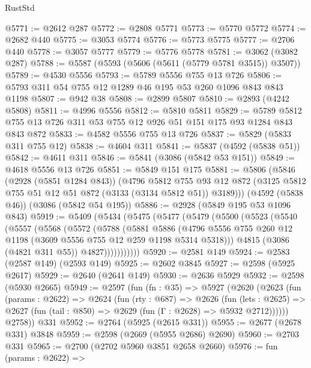 \begin{lexlean}{RustStd}
\begin{coremodule}
@5771 := @2612 @287
@5772 := @2808 @5771
@5773 := @5770 @5772
@5774 := @2682 @440
@5775 := @3053 @5774
@5776 := @5773 @5775
@5777 := @2706 @440
@5778 := @3057 @5777
@5779 := @5776 @5778
@5781 := @3062 (@3082 @287)
@5788 := @5587 (@5593 (@5606 (@5611 (@5779 @5781 @3515)) @3507))
@5789 := @4530 @5556
@5793 := @5789 @5556 @755 @13 @726
@5806 := @5793 @311 @54 @755 @12 @1289 @46 @195 @53 @260 @1096 @843 @843 @1198
@5807 := @942 @38
@5808 := @2899 @5807
@5810 := @2893 (@4242 @5808)
@5811 := @4996 @5556
@5812 := @5810 @5811
@5829 := @5789 @5812 @755 @13 @726 @311 @53 @755 @12 @926 @51 @151 @175 @93 @1284 @843 @843 @872
@5833 := @4582 @5556 @755 @13 @726
@5837 := @5829 (@5833 @311 @755 @12)
@5838 := @4604 @311
@5841 := @5837 (@4592 (@5838 @51))
@5842 := @4611 @311
@5846 := @5841 (@3086 (@5842 @53 @151))
@5849 := @4618 @5556 @13 @726
@5851 := @5849 @151 @175
@5881 := @5806
    (@5846
      (@2928 (@5851 @1284 @843))
      (@4796
        @5812
        @755
        @93
        @12
        @872
        (@3125 @5812 @755 @51 @12 @51 @872 (@3133 (@3134 @5812 @51)) @3189)))
    (@4592 (@5838 @46))
    (@3086 (@5842 @54 @195))
@5886 := @2928 (@5849 @195 @53 @1096 @843)
@5919 := @5409
    (@5434
      (@5475
        (@5477
          (@5479
            (@5500
              (@5523
                (@5540
                  (@5557
                    (@5568
                      (@5572
                        (@5788
                          (@5881
                            @5886
                            (@4796
                              @5556
                              @755
                              @260
                              @12
                              @1198
                              (@3609 @5556 @755 @12 @259 @1198 @5314 @5318)))
                          @4815
                          (@3086 (@4821 @311 @55))
                          @4827)))))))))))
@5920 := @2581 @149
@5924 := @2583 (@2587 @149) (@2593 @149)
@5925 := @2602 @3845
@5927 := @2598 (@5925 @2617)
@5929 := @2640 (@2641 @149)
@5930 := @2636 @5929
@5932 := @2598 (@5930 @2665)
@5949 := @2597
    (fun (fn : @35) =>
    @5927
      (@2620
        (@2623
          (fun (params : @2622) =>
          @2624
            (fun (rty : @687) =>
            @2626
              (fun (lets : @2625) =>
              @2627 (fun (tail : @850) => @2629 (fun (Γ : @2628) => @5932 @2712))))))
        @2758))
    @331
@5952 := @2764 (@5925 (@2615 @331))
@5955 := @2677 (@2678 @331) @3848
@5959 := @2598 (@2669 (@5955 @2686) @2690)
@5960 := @2703 @331
@5965 := @2700 (@2702 @5960 @3851 @2658 @2660)
@5976 := fun (params : @2622) =>

\end{coremodule}
\end{lexlean}
